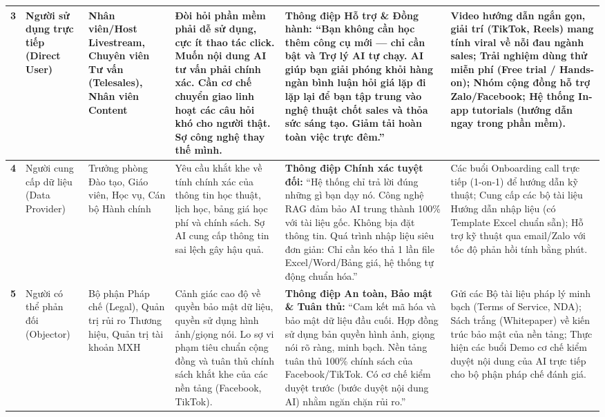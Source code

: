 \begin{table}[H]
\begin{tabularx}{\linewidth}{@{} c L{2.2cm} L{2.5cm} L{3cm} Y L{2.8cm} @{}}
        \textbf{3} &
        Người sử dụng trực tiếp (Direct User) &
        Nhân viên/Host Livestream, Chuyên viên Tư vấn (Telesales), Nhân viên Content &
        Đòi hỏi phần mềm phải dễ sử dụng, cực ít thao tác click. Muốn nội dung AI tư vấn phải chính xác. Cần cơ chế chuyển giao linh hoạt các câu hỏi khó cho người thật. Sợ công nghệ thay thế mình. &
        \textbf{Thông điệp Hỗ trợ \& Đồng hành:} ``Bạn không cần học thêm công cụ mới --- chỉ cần bật và Trợ lý AI tự chạy. AI giúp bạn giải phóng khỏi hàng ngàn bình luận hỏi giá lặp đi lặp lại để bạn tập trung vào nghệ thuật chốt sales và thỏa sức sáng tạo. Giảm tải hoàn toàn việc trực đêm.'' &
        Video hướng dẫn ngắn gọn, giải trí (TikTok, Reels) mang tính viral về nỗi đau ngành sales; Trải nghiệm dùng thử miễn phí (Free trial / Hands-on); Nhóm cộng đồng hỗ trợ Zalo/Facebook; Hệ thống In-app tutorials (hướng dẫn ngay trong phần mềm). \\ \midrule

        \textbf{4} &
        Người cung cấp dữ liệu (Data Provider) &
        Trưởng phòng Đào tạo, Giáo viên, Học vụ, Cán bộ Hành chính &
        Yêu cầu khắt khe về tính chính xác của thông tin học thuật, lịch học, bảng giá học phí và chính sách. Sợ AI cung cấp thông tin sai lệch gây hậu quả. &
        \textbf{Thông điệp Chính xác tuyệt đối:} ``Hệ thống chỉ trả lời đúng những gì bạn dạy nó. Công nghệ RAG đảm bảo AI trung thành 100\% với tài liệu gốc. Không bịa đặt thông tin. Quá trình nhập liệu siêu đơn giản: Chỉ cần kéo thả 1 lần file Excel/Word/Bảng giá, hệ thống tự động chuẩn hóa.'' &
        Các buổi Onboarding call trực tiếp (1-on-1) để hướng dẫn kỹ thuật; Cung cấp các bộ tài liệu Hướng dẫn nhập liệu (có Template Excel chuẩn sẵn); Hỗ trợ kỹ thuật qua email/Zalo với tốc độ phản hồi tính bằng phút. \\ \midrule

        \textbf{5} &
        Người có thể phản đối (Objector) &
        Bộ phận Pháp chế (Legal), Quản trị rủi ro Thương hiệu, Quản trị tài khoản MXH &
        Cảnh giác cao độ về quyền bảo mật dữ liệu, quyền sử dụng hình ảnh/giọng nói. Lo sợ vi phạm tiêu chuẩn cộng đồng và tuân thủ chính sách khắt khe của các nền tảng (Facebook, TikTok). &
        \textbf{Thông điệp An toàn, Bảo mật \& Tuân thủ:} ``Cam kết mã hóa và bảo mật dữ liệu đầu cuối. Hợp đồng sử dụng bản quyền hình ảnh, giọng nói rõ ràng, minh bạch. Nền tảng tuân thủ 100\% chính sách của Facebook/TikTok. Có cơ chế kiểm duyệt trước (bước duyệt nội dung AI) nhằm ngăn chặn rủi ro.'' &
        Gửi các Bộ tài liệu pháp lý minh bạch (Terms of Service, NDA); Sách trắng (Whitepaper) về kiến trúc bảo mật của nền tảng; Thực hiện các buổi Demo cơ chế kiểm duyệt nội dung của AI trực tiếp cho bộ phận pháp chế đánh giá. \\ \bottomrule
    \end{tabularx}
\end{table}

